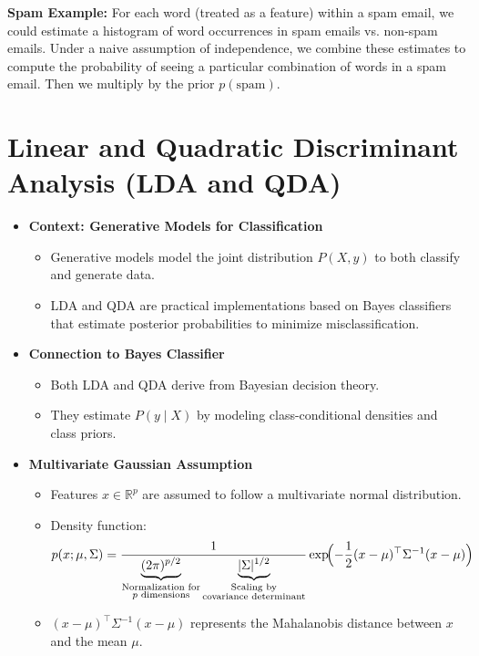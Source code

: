 \documentclass[10pt]{article}
\begin{document}
\noindent
\textbf{Spam Example:} For each word (treated as a feature) within a spam email, we could estimate a histogram of word occurrences in spam emails vs. non-spam emails. Under a naive assumption of independence, we combine these estimates to compute the probability of seeing a particular combination of words in a spam email. Then we multiply by the prior \(p(\text{spam})\).

\section{Linear and Quadratic Discriminant Analysis (LDA and QDA)}

\begin{itemize}
    \item \textbf{Context: Generative Models for Classification}
    \begin{itemize}
        \item Generative models model the joint distribution \(P(X,y)\) to both classify and generate data.
        \item LDA and QDA are practical implementations based on Bayes classifiers that estimate posterior probabilities to minimize misclassification.
    \end{itemize}
    
    \item \textbf{Connection to Bayes Classifier}
    \begin{itemize}
        \item Both LDA and QDA derive from Bayesian decision theory.
        \item They estimate \(P(y \mid X)\) by modeling class-conditional densities and class priors.
    \end{itemize}
    
    \item \textbf{Multivariate Gaussian Assumption}
    \begin{itemize}
        \item Features \(x \in \mathbb{R}^p\) are assumed to follow a multivariate normal distribution.
        \item Density function:
        \[
        p(x; \mu, \Sigma) = \frac{1}{\underbrace{(2\pi)^{p/2}}_{\substack{\text{Normalization for} \\ \text{\(p\) dimensions}}} \underbrace{|\Sigma|^{1/2}}_{\substack{\text{Scaling by} \\ \text{covariance determinant}}}} \exp\!\Bigl(-\frac{1}{2}(x-\mu)^\top\Sigma^{-1}(x-\mu)\Bigr)
        \]
        \item \((x-\mu)^\top \Sigma^{-1}(x-\mu)\) represents the Mahalanobis distance between \(x\) and the mean \(\mu\).
    \end{itemize}
    

\end{itemize}
\end{document}
